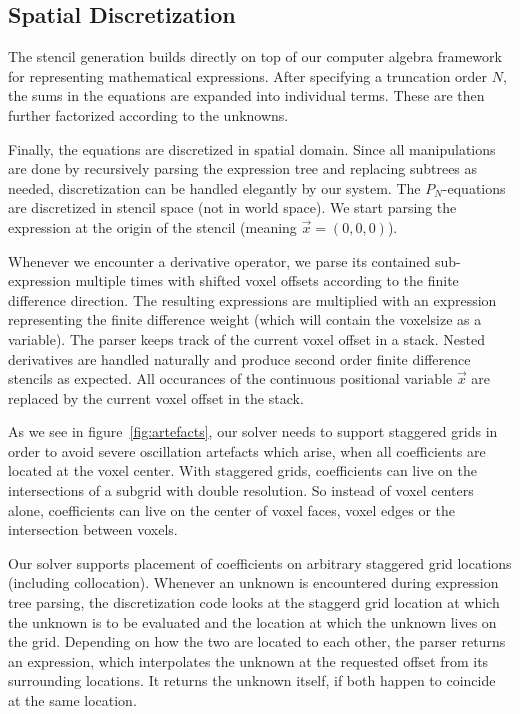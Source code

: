 \subsection{Spatial Discretization}

The stencil generation builds directly on top of our computer algebra framework for representing mathematical expressions. After specifying a truncation order $N$, the sums in the equations are expanded into individual terms. These are then further factorized according to the unknowns. 

Finally, the equations are discretized in spatial domain. Since all manipulations are done by recursively parsing the expression tree and replacing subtrees as needed, discretization can be handled elegantly by our system. The $P_N$-equations are discretized in stencil space (not in world space). We start parsing the expression at the origin of the stencil (meaning $\vec{x}=(0,0,0)$). 

Whenever we encounter a derivative operator, we parse its contained sub-expression multiple times with shifted voxel offsets according to the finite difference direction. The resulting expressions are multiplied with an expression representing the finite difference weight (which will contain the voxelsize as a variable). The parser keeps track of the current voxel offset in a stack. Nested derivatives are handled naturally and produce second order finite difference stencils as expected. All occurances of the continuous positional variable $\vec{x}$ are replaced by the current voxel offset in the stack. 

As we see in figure~\ref{fig:artefacts}, our solver needs to support staggered grids in order to avoid severe oscillation artefacts which arise, when all coefficients are located at the voxel center. With staggered grids, coefficients can live on the intersections of a subgrid with double resolution. So instead of voxel centers alone, coefficients can live on the center of voxel faces, voxel edges or the intersection between voxels.

Our solver supports placement of coefficients on arbitrary staggered grid locations (including collocation). Whenever an unknown is encountered during expression tree parsing, the discretization code looks at the staggerd grid location at which the unknown is to be evaluated and the location at which the unknown lives on the grid. Depending on how the two are located to each other, the parser returns an expression, which interpolates the unknown at the requested offset from its surrounding locations. It returns the unknown itself, if both happen to coincide at the same location.

